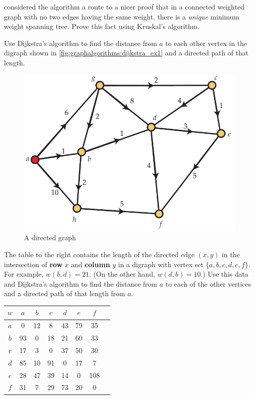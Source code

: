 \begin{enumerate}
  considered the algorithm a route to a nicer proof that in a
  connected weighted graph with no two edges having the same weight,
  there is a \emph{unique} minimum weight spanning tree. Prove this
  fact using Kruskal's algorithm.
\item Use Dijkstra's algorithm to find the distance from $a$ to each
  other vertex in the digraph shown in
  \autoref{fig:graphalgorithms:dijkstra_ex1} and a directed path of
  that length.
  \begin{figure}[h]
    \centering
    \includegraphics[scale=0.65]{graphalgorithms-figs/dijkstra_ex1}
    \caption{A directed graph}
    \label{fig:graphalgorithms:dijkstra_ex1}
  \end{figure} 

\begin{minipage}{0.5\textwidth}
\item The table to the right contains the length of the directed edge
  $(x,y)$ in the intersection of \textbf{row} $x$ and \textbf{column}
  $y$ in a digraph with vertex set $\{a,b,c,d,e,f\}$. For example,
  $w(b,d)=21$. (On the other hand, $w(d,b)=10$.) Use this data and
  Dijkstra's algorithm to find the distance from $a$ to each of the
  other vertices and a directed path of that length from $a$.
\end{minipage}\hspace{0.02\textwidth}\begin{minipage}{0.45\textwidth}
\begin{tabular}{|c|c|c|c|c|c|c|c|}
  \hline
  $w$ &  $a$ &  $b$ &  $c$ &  $d$ &  $e$ &  $f$ \\ \hline 
  $a$ &  0 & 12 & 8 & 43 & 79 & 35 \\ \hline 
  $b$ & 93 &  0 & 18 & 21 & 60 & 33  \\ \hline 
  $c$ & 17 & 3 &  0 & 37 & 50  & 30 \\ \hline 
  $d$ & 85 & 10 & 91 &  0 & 17  & 7 \\ \hline 
  $e$ & 28 & 47 & 39 & 14  &  0 & 108 \\ \hline 
  $f$ & 31 & 7  & 29 & 73 & 20 &  0 \\ \hline 
\end{tabular}
\end{minipage}


\end{enumerate}
